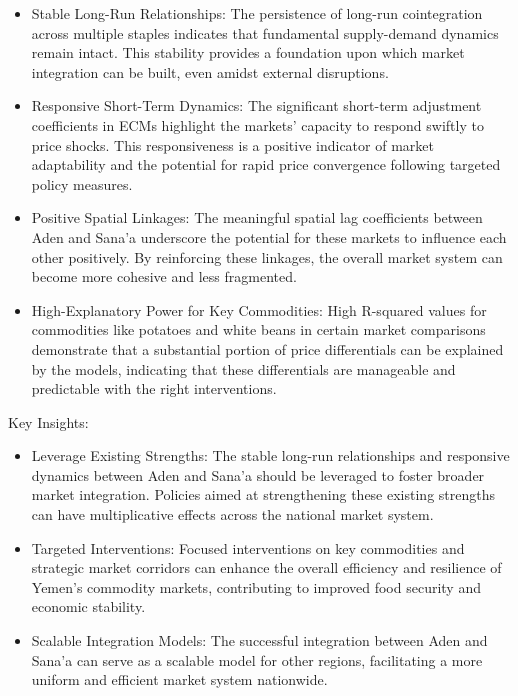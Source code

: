 \begin{itemize}
\item Stable Long-Run Relationships: The persistence of long-run cointegration across multiple staples indicates that fundamental supply-demand dynamics remain intact. This stability provides a foundation upon which market integration can be built, even amidst external disruptions.

\item Responsive Short-Term Dynamics: The significant short-term adjustment coefficients in ECMs highlight the markets' capacity to respond swiftly to price shocks. This responsiveness is a positive indicator of market adaptability and the potential for rapid price convergence following targeted policy measures.

\item Positive Spatial Linkages: The meaningful spatial lag coefficients between Aden and Sana'a underscore the potential for these markets to influence each other positively. By reinforcing these linkages, the overall market system can become more cohesive and less fragmented.

\item High-Explanatory Power for Key Commodities: High R-squared values for commodities like potatoes and white beans in certain market comparisons demonstrate that a substantial portion of price differentials can be explained by the models, indicating that these differentials are manageable and predictable with the right interventions.
\end{itemize}

Key Insights:
\begin{itemize}
\item Leverage Existing Strengths: The stable long-run relationships and responsive dynamics between Aden and Sana'a should be leveraged to foster broader market integration. Policies aimed at strengthening these existing strengths can have multiplicative effects across the national market system.
  
\item Targeted Interventions: Focused interventions on key commodities and strategic market corridors can enhance the overall efficiency and resilience of Yemen's commodity markets, contributing to improved food security and economic stability.
  
\item Scalable Integration Models: The successful integration between Aden and Sana'a can serve as a scalable model for other regions, facilitating a more uniform and efficient market system nationwide.
\end{itemize}


